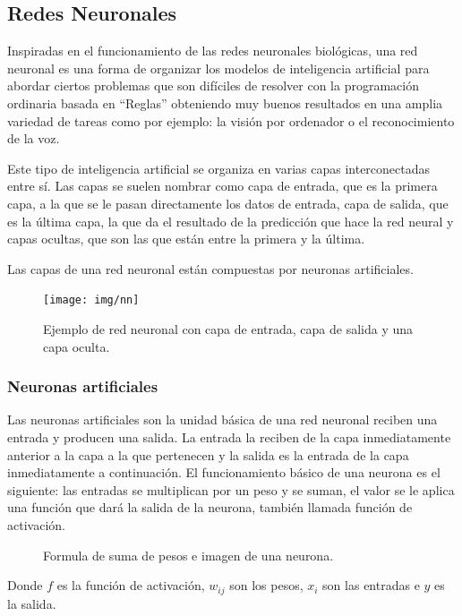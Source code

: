 \documentclass[12pt,a4paper]{article}
\begin{document}
\subsection{Redes Neuronales}
Inspiradas en el funcionamiento de las redes neuronales biológicas, una red neuronal es una forma de organizar los modelos de inteligencia artificial para abordar ciertos problemas que son difíciles de resolver con la programación ordinaria basada en ``Reglas'' obteniendo muy buenos resultados en una amplia variedad de tareas como por ejemplo: la visión por ordenador o el reconocimiento de la voz.
\bigskip

Este tipo de inteligencia artificial se organiza en varias capas interconectadas entre sí. Las capas se suelen nombrar como capa de entrada, que es la primera capa, a la que se le pasan directamente los datos de entrada, capa de salida, que es la última capa, la que da el resultado de la predicción que hace la red neural y capas ocultas, que son las que están entre la primera y la última.
\bigskip

Las capas de una red neuronal están compuestas por neuronas artificiales.

\begin{figure}[H]
\centering
\texttt{[image: img/nn]}
\caption{Ejemplo de red neuronal con capa de entrada, capa de salida y una capa oculta.}
\end{figure}

\subsubsection{Neuronas artificiales}
Las neuronas artificiales son la unidad básica de una red neuronal reciben una entrada y producen una salida. La entrada la reciben de la capa inmediatamente anterior a la capa a la que pertenecen y la salida es la entrada de la capa inmediatamente a continuación. El funcionamiento básico de una neurona es el siguiente: las entradas se multiplican por un peso y se suman, el valor se le aplica una función que dará la salida de la neurona, también llamada función de activación.

\begin{figure}[H]
\centering
{}%
\qquad
{}%
\caption{Formula de suma de pesos e imagen de una neurona.}
\end{figure}

Donde $f$ es la función de activación, $w_{ij}$ son los pesos, $x_{i}$ son las entradas e $y$ es la salida.
\bigskip
\end{document}
